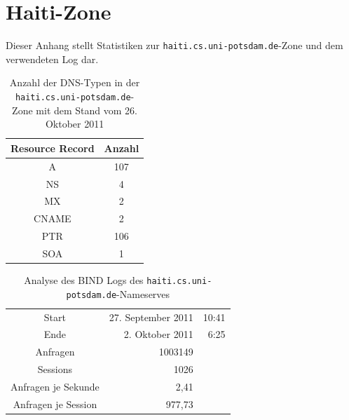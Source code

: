 \documentclass[a4paper, 12pt, BCOR10mm, DIV12, toc=bibliography, toc=listof, german]{scrbook}
\begin{document}

	\chapter{Haiti-Zone} %
	\label{cha:haiti}

		Dieser Anhang stellt Statistiken zur \texttt{haiti.cs.uni-potsdam.de}-Zone und dem verwendeten
		Log dar.

		\begin{table}[h]
			\centering
			\begin{tabular}{|c|c|}\hline
				Resource Record & Anzahl \\\hline\hline
				A & 107 \\
				NS & 4 \\
				MX & 2 \\
				CNAME & 2 \\
				PTR & 106 \\
				SOA & 1 \\\hline
			\end{tabular}
			\caption{Anzahl der DNS-Typen in der \texttt{haiti.cs.uni-potsdam.de}-Zone mit dem Stand vom 26. Oktober 2011}
			\label{tab:rr-domain}
		\end{table}

		\begin{table}[h]
			\centering
			\begin{tabular}{|c|rr|}\hline
				Start & 27. September 2011 & 10:41 \\
				Ende & 2. Oktober 2011 & 6:25 \\
				Anfragen & 1003149 & \\
				Sessions & 1026 & \\
				Anfragen je Sekunde & 2,41 &\\
				Anfragen je Session & 977,73 &\\ \hline
			\end{tabular}
			\caption{Analyse des BIND Logs des \texttt{haiti.cs.uni-potsdam.de}-Nameserves}
			\label{tab:log}
		\end{table}
\end{document}
